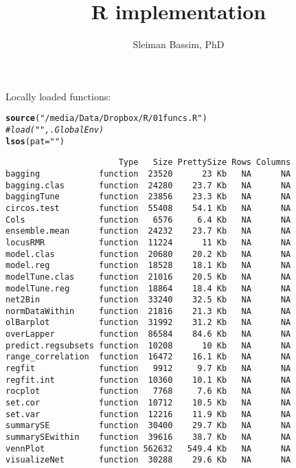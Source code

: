\documentclass[9pt,english]{extarticle}\usepackage[]{graphicx}\usepackage[]{color}
\makeatletter
\newcommand{\hlstr}[1]{\textcolor[rgb]{0.192,0.494,0.8}{#1}}%
\newcommand{\hlcom}[1]{\textcolor[rgb]{0.678,0.584,0.686}{\textit{#1}}}%
\newcommand{\hlstd}[1]{\textcolor[rgb]{0.345,0.345,0.345}{#1}}%
\newcommand{\hlkwc}[1]{\textcolor[rgb]{0.333,0.667,0.333}{#1}}%
\newcommand{\hlkwd}[1]{\textcolor[rgb]{0.737,0.353,0.396}{\textbf{#1}}}%
\newenvironment{kframe}{%
 \def\at@end@of@kframe{}%
 \ifinner\ifhmode%
  \def\at@end@of@kframe{\end{minipage}}%
  \begin{minipage}{\columnwidth}%
 \fi\fi%
 \def\FrameCommand##1{\hskip\@totalleftmargin \hskip-\fboxsep
 \colorbox{shadecolor}{##1}\hskip-\fboxsep
     \hskip-\linewidth \hskip-\@totalleftmargin \hskip\columnwidth}%
 \MakeFramed {\advance\hsize-\width
   \@totalleftmargin\z@ \linewidth\hsize
   \@setminipage}}%
 {\par\unskip\endMakeFramed%
 \at@end@of@kframe}
\newenvironment{knitrout}{}{} %
\makeatother
\begin{document}
\author{Sleiman Bassim, PhD}
\title{R implementation}
\maketitle
\begin{linenumbers}



Locally loaded functions:
\begin{knitrout}
\color{fgcolor}\begin{kframe}
\begin{alltt}
\hlkwd{source}\hlstd{(}\hlstr{"/media/Data/Dropbox/R/01funcs.R"}\hlstd{)}
\hlcom{#load("", .GlobalEnv)}
\hlkwd{lsos}\hlstd{(}\hlkwc{pat}\hlstd{=}\hlstr{""}\hlstd{)}
\end{alltt}
\begin{verbatim}
                       Type   Size PrettySize Rows Columns
bagging            function  23520      23 Kb   NA      NA
bagging.clas       function  24280    23.7 Kb   NA      NA
baggingTune        function  23856    23.3 Kb   NA      NA
circos.test        function  55408    54.1 Kb   NA      NA
Cols               function   6576     6.4 Kb   NA      NA
ensemble.mean      function  24232    23.7 Kb   NA      NA
locusRMR           function  11224      11 Kb   NA      NA
model.clas         function  20680    20.2 Kb   NA      NA
model.reg          function  18528    18.1 Kb   NA      NA
modelTune.clas     function  21016    20.5 Kb   NA      NA
modelTune.reg      function  18864    18.4 Kb   NA      NA
net2Bin            function  33240    32.5 Kb   NA      NA
normDataWithin     function  21816    21.3 Kb   NA      NA
olBarplot          function  31992    31.2 Kb   NA      NA
overLapper         function  86584    84.6 Kb   NA      NA
predict.regsubsets function  10208      10 Kb   NA      NA
range_correlation  function  16472    16.1 Kb   NA      NA
regfit             function   9912     9.7 Kb   NA      NA
regfit.int         function  10360    10.1 Kb   NA      NA
rocplot            function   7768     7.6 Kb   NA      NA
set.cor            function  10712    10.5 Kb   NA      NA
set.var            function  12216    11.9 Kb   NA      NA
summarySE          function  30400    29.7 Kb   NA      NA
summarySEwithin    function  39616    38.7 Kb   NA      NA
vennPlot           function 562632   549.4 Kb   NA      NA
visualizeNet       function  30288    29.6 Kb   NA      NA
\end{verbatim}
\end{kframe}
\end{knitrout}


\end{linenumbers}
\end{document}
